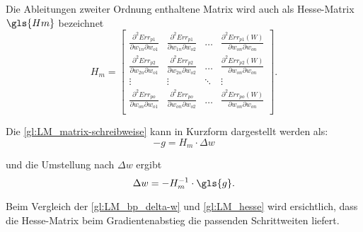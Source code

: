 Die Ableitungen zweiter Ordnung enthaltene Matrix wird auch als Hesse-Matrix $\gls{Hm}$ bezeichnet
\begin{equation}
H_m
 =
 \begin{bmatrix}
    \frac{\partial^2 Err_{p1}}{\partial w_{1n} \partial w_{o1}} & \frac{\partial^2 Err_{p1}}{\partial w_{1n} \partial w_{o2}}  & \dots  & \frac{\partial^2 Err_{p1}(W)}{\partial w_{on} \partial w_{on}} \\
    \frac{\partial^2 Err_{p2}}{\partial w_{2n} \partial w_{o1}} & \frac{\partial^2 Err_{p2}}{\partial w_{2n} \partial w_{o2}}  & \dots  & \frac{\partial^2 Err_{p2}(W)}{\partial w_{on} \partial w_{on}} \\
    \vdots & \vdots & \ddots & \vdots \\
    \frac{\partial^2 Err_{po}}{\partial w_{on} \partial w_{o1}} & \frac{\partial^2 Err_{po}}{\partial w_{on} \partial w_{o2}}  & \dots  & \frac{\partial^2 Err_{po}(W)}{\partial w_{on} \partial w_{on}} \\
 \label{gl:LM_hesse-mat}
 \end{bmatrix}
 .
\end{equation}

Die \autoref{gl:LM_matrix-schreibweise} kann in Kurzform dargestellt werden als:
\begin{equation}
-g=H_m \cdot \Delta w
\end{equation}

und die Umstellung nach $\Delta w$ ergibt
\begin{equation}
\Delta w =-H_m^{-1} \cdot \gls{g}.
\label{gl:LM_hesse}
\end{equation}

Beim Vergleich der \autoref{gl:LM_bp_delta-w} und \autoref{gl:LM_hesse} wird ersichtlich, dass die Hesse-Matrix beim Gradientenabstieg die passenden Schrittweiten liefert.

